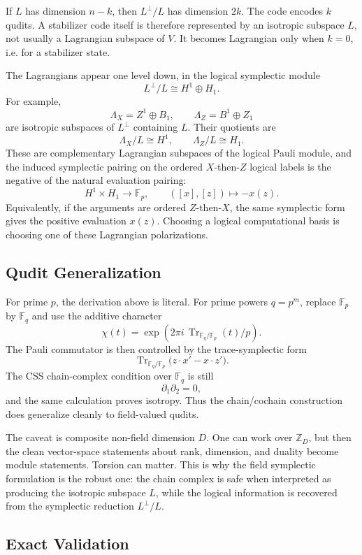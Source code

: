 If \(L\) has dimension \(n-k\), then \(L^\perp/L\) has dimension \(2k\). The
code encodes \(k\) qudits. A stabilizer code itself is therefore represented by
an isotropic subspace \(L\), not usually a Lagrangian subspace of \(V\). It
becomes Lagrangian only when \(k=0\), i.e. for a stabilizer state.

The Lagrangians appear one level down, in the logical symplectic module
\[
  L^\perp/L\cong H^1\oplus H_1.
\]
For example,
\[
  \Lambda_X=Z^1\oplus B_1,\qquad
  \Lambda_Z=B^1\oplus Z_1
\]
are isotropic subspaces of \(L^\perp\) containing \(L\). Their quotients are
\[
  \Lambda_X/L\cong H^1,\qquad
  \Lambda_Z/L\cong H_1.
\]
These are complementary Lagrangian subspaces of the logical Pauli module, and
the induced symplectic pairing on the ordered \(X\)-then-\(Z\) logical labels
is the negative of the natural evaluation pairing:
\[
  H^1\times H_1\longrightarrow \mathbb F_p,\qquad
  ([x],[z])\mapsto -x(z).
\]
Equivalently, if the arguments are ordered \(Z\)-then-\(X\), the same
symplectic form gives the positive evaluation \(x(z)\).
Choosing a logical computational basis is choosing one of these Lagrangian
polarizations.

\subsection{Qudit Generalization}

For prime \(p\), the derivation above is literal. For prime powers \(q=p^m\),
replace \(\mathbb F_p\) by \(\mathbb F_q\) and use the additive character
\[
  \chi(t)=\exp(2\pi i\,\operatorname{Tr}_{\mathbb F_q/\mathbb F_p}(t)/p).
\]
The Pauli commutator is then controlled by the trace-symplectic form
\[
  \operatorname{Tr}_{\mathbb F_q/\mathbb F_p}
  \bigl(z\cdot x'-x\cdot z'\bigr).
\]
The CSS chain-complex condition over \(\mathbb F_q\) is still
\[
  \partial_1\partial_2=0,
\]
and the same calculation proves isotropy. Thus the chain/cochain construction
does generalize cleanly to field-valued qudits.

The caveat is composite non-field dimension \(D\). One can work over
\(\mathbb Z_D\), but then the clean vector-space statements about rank,
dimension, and duality become module statements. Torsion can matter. This is
why the field symplectic formulation is the robust one: the chain complex is
safe when interpreted as producing the isotropic subspace \(L\), while the
logical information is recovered from the symplectic reduction \(L^\perp/L\).

\subsection{Exact Validation}


